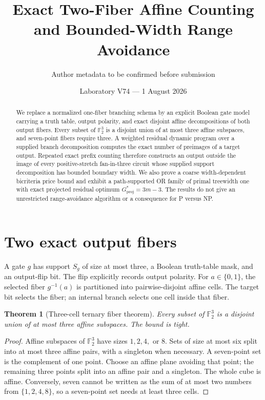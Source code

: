 \documentclass[11pt]{article}
\title{Exact Two-Fiber Affine Counting and Bounded-Width Range Avoidance}
\author{Author metadata to be confirmed before submission}
\date{Laboratory V74 --- 1 August 2026}
\newtheorem{theorem}{Theorem}[section]
\newcommand{\Ftwo}{\mathbb F_2}
\newcommand{\Gproj}{G_{\mathrm{proj}}}
\begin{document}
\maketitle

\begin{abstract}
We replace a normalized one-fiber branching schema by an explicit Boolean gate model carrying a truth table, output polarity, and exact disjoint affine decompositions of both output fibers. Every subset of $\Ftwo^3$ is a disjoint union of at most three affine subspaces, and seven-point fibers require three. A weighted residual dynamic program over a supplied branch decomposition computes the exact number of preimages of a target output. Repeated exact prefix counting therefore constructs an output outside the image of every positive-stretch fan-in-three circuit whose supplied support decomposition has bounded boundary width. We also prove a coarse width-dependent bicriteria price bound and exhibit a path-supported OR family of primal treewidth one with exact projected residual optimum $\Gproj^*=3m-3$. The results do not give an unrestricted range-avoidance algorithm or a consequence for P versus NP.
\end{abstract}

\section{Two exact output fibers}
A gate $g$ has support $S_g$ of size at most three, a Boolean truth-table mask, and an output-flip bit. The flip explicitly records output polarity. For $a\in\{0,1\}$, the selected fiber $g^{-1}(a)$ is partitioned into pairwise-disjoint affine cells. The target bit selects the fiber; an internal branch selects one cell inside that fiber.

\begin{theorem}[Three-cell ternary fiber theorem]
Every subset of $\Ftwo^3$ is a disjoint union of at most three affine subspaces. The bound is tight.
\end{theorem}

\begin{proof}
Affine subspaces of $\Ftwo^3$ have sizes $1,2,4,$ or $8$. Sets of size at most six split into at most three affine pairs, with a singleton when necessary. A seven-point set is the complement of one point. Choose an affine plane avoiding that point; the remaining three points split into an affine pair and a singleton. The whole cube is affine. Conversely, seven cannot be written as the sum of at most two numbers from $\{1,2,4,8\}$, so a seven-point set needs at least three cells.
\end{proof}
\end{document}
